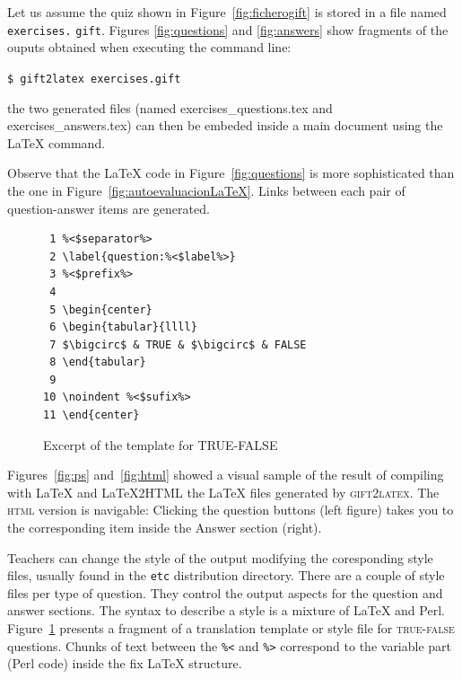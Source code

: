 \documentclass{pracjourn}[2006/02/20]
\begin{document}
Let us assume the quiz shown in Figure~\ref{fig:ficherogift} is stored in 
a file named \verb|exercises.| \verb|gift|.
%
Figures \ref{fig:questions} and \ref{fig:answers} show fragments of the ouputs 
obtained when executing the command line:

\begin{center}
\verb|$ gift2latex exercises.gift| 
\end{center}

\noindent the two generated files (named exercises\_questions.tex and
exercises\_answers.tex) can then be embeded inside a main document
using the \LaTeX{} \verb|| command.

Observe that the \LaTeX{} code in Figure~\ref{fig:questions}
is more sophisticated than the one
in Figure~\ref{fig:autoevaluacionLaTeX}. 
Links between each pair of question-answer 
items are generated.


\begin{figure}[hbt]
\mbox{}\hrulefill
\vspace{-.6em}
\begin{footnotesize}
\begin{verbatim}
 1 %<$separator%>
 2 \label{question:%<$label%>}
 3 %<$prefix%>
 4 
 5 \begin{center}
 6 \begin{tabular}{llll}
 7 $\bigcirc$ & TRUE & $\bigcirc$ & FALSE
 8 \end{tabular}
 9 
10 \noindent %<$sufix%>
11 \end{center} \end{verbatim}
\end{footnotesize}
\vspace{-1.5em}
\hrulefill
\caption{Excerpt of the template for TRUE-FALSE}
\label{fig:truefalsetemplate}
\end{figure}

Figures~\ref{fig:ps} and~\ref{fig:html} showed a 
visual sample of the result of compiling with \LaTeX{} 
and \LaTeX2HTML{} the \LaTeX{} files generated by \textsc{gift2latex}.
%
The \textsc{html} version is navigable: Clicking the question buttons (left figure)
takes you to the corresponding item inside the Answer section (right).


Teachers can change the style of the output modifying the 
coresponding style files, usually found
in the \verb|etc| distribution directory.
%
There are a couple of style files per type of question.
They control
the output aspects for the question and answer sections. 
The syntax to describe a style 
is a mixture of \LaTeX{} and Perl.
%
Figure~\ref{fig:truefalsetemplate} presents a fragment of 
a translation template or style file for \textsc{true-false}
questions.
Chunks of text between the \verb|%<| and \verb|%>| correspond to the variable part
(Perl code) inside the fix \LaTeX{} structure.
\end{document}

